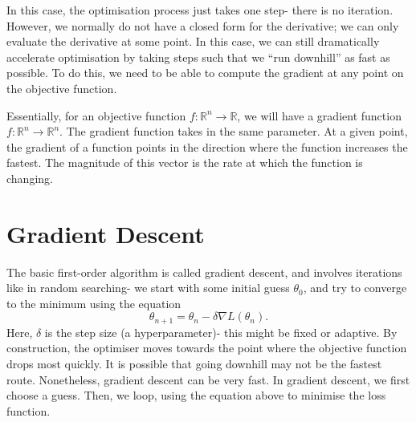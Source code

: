 \documentclass[a4paper, openany]{memoir}
\begin{document}
In this case, the optimisation process just takes one step- there is no iteration. However, we normally do not have a closed form for the derivative; we can only evaluate the derivative at some point. In this case, we can still dramatically accelerate optimisation by taking steps such that we ``run downhill'' as fast as possible. To do this, we need to be able to compute the gradient at any point on the objective function.

Essentially, for an objective function $f: \mathbb{R}^n \to \mathbb{R}$, we will have a gradient function $f: \mathbb{R}^n \to \mathbb{R}^n$. The gradient function takes in the same parameter. At a given point, the gradient of a function points in the direction where the function increases the fastest. The magnitude of this vector is the rate at which the function is changing.
\newpage

\section{Gradient Descent}
The basic first-order algorithm is called gradient descent, and involves iterations like in random searching- we start with some initial guess $\theta_0$, and try to converge to the minimum using the equation
\[\theta_{n+1} = \theta_n - \delta \nabla L(\theta_n).\]
Here, $\delta$ is the step size (a hyperparameter)- this might be fixed or adaptive. By construction, the optimiser moves towards the point where the objective function drops most quickly. It is possible that going downhill may not be the fastest route. Nonetheless, gradient descent can be very fast. In gradient descent, we first choose a guess. Then, we loop, using the equation above to minimise the loss function. 
\end{document}
